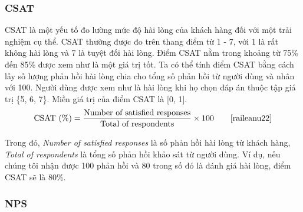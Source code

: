 \subsubsection{CSAT}

CSAT là một yếu tố đo lường mức độ hài lòng của khách hàng đối với một trải nghiệm cụ thể. CSAT thường được đo trên thang điểm từ 1 - 7, với 1 là rất không hài lòng và 7 là tuyệt đối hài lòng. Điểm CSAT nằm trong khoảng từ 75\% đến 85\% được xem như là một giá trị tốt. Ta có thể tính điểm CSAT bằng cách lấy số lượng phản hồi hài lòng chia cho tổng số phản hồi từ người dùng và nhân với 100. Người dùng được xem như là hài lòng khi họ chọn đáp án thuộc tập giá trị \{5, 6, 7\}. Miền giá trị của điểm CSAT là [0, 1].
\[ \text{CSAT (\%)} = \frac{\text{Number of satisfied responses}}{\text{Total of respondents}} \times 100 \tag*{\cite{raileanu22}}\]
\par
Trong đó, \emph{Number of satisfied responses} là số phản hồi hài lòng từ khách hàng, \emph{Total of respondents} là tổng số phản hồi khảo sát từ người dùng. Ví dụ, nếu chúng tôi nhận được 100 phản hồi và 80 trong số đó là đánh giá hài lòng, điểm CSAT sẽ là 80\%.

\subsubsection{NPS}

